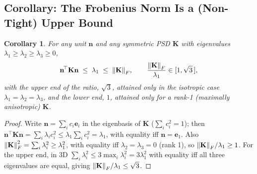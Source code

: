 \documentclass[11pt, a4paper, parskip]{scrartcl}
\theoremstyle{plain}
\newtheorem{corollary}{Corollary}
\theoremstyle{definition}
\theoremstyle{remark}
\newcommand{\Kmat}{\mathbf{K}}                            %
\newcommand{\nunit}{\mathbf{n}}                           %
\begin{document}
\subsection{Corollary: The Frobenius Norm Is a (Non-Tight) Upper Bound}
\begin{corollary}
\label{cor:frobenius}
For any unit $\nunit$ and any symmetric PSD $\Kmat$ with eigenvalues
$\lambda_1\geq\lambda_2\geq\lambda_3\geq0$,
\begin{equation}
  \nunit^{\!\top}\Kmat\nunit \; \leq \; \lambda_1 \; \leq \; \norm{\Kmat}_F ,
  \qquad
  \frac{\norm{\Kmat}_F}{\lambda_1} \in [1,\sqrt3\,] ,
\end{equation}
with the upper end of the ratio, $\sqrt3$, attained \emph{only} in the
isotropic case $\lambda_1=\lambda_2=\lambda_3$, and the lower end, $1$,
attained only for a rank-1 (maximally anisotropic) $\Kmat$.
\end{corollary}
\begin{proof}
Write $\nunit=\sum_i c_i\mathbf e_i$ in the eigenbasis of $\Kmat$
($\sum_ic_i^2=1$); then $\nunit^{\!\top}\Kmat\nunit=\sum_i\lambda_ic_i^2
\leq\lambda_1\sum_ic_i^2=\lambda_1$, with equality iff $\nunit=\mathbf
e_1$. Also $\norm{\Kmat}_F^2=\sum_i\lambda_i^2\geq\lambda_1^2$, with
equality iff $\lambda_2=\lambda_3=0$ (rank 1), so $\norm{\Kmat}_F/\lambda_1
\geq1$. For the upper end, in 3D $\sum_i\lambda_i^2 \leq
3\max_i\lambda_i^2=3\lambda_1^2$ with equality iff all three eigenvalues
are equal, giving $\norm{\Kmat}_F/\lambda_1\leq\sqrt3$.
\end{proof}
\end{document}
